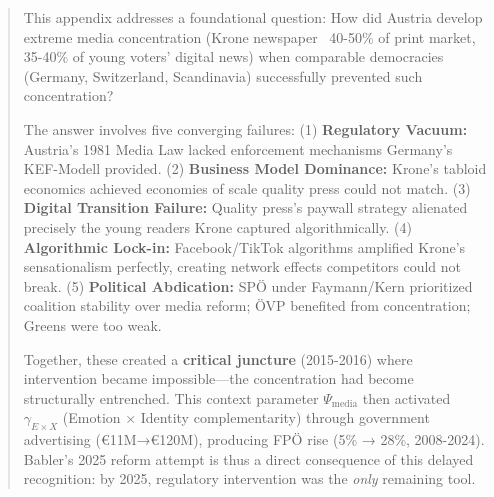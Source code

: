 
\begin{abstract}

This appendix addresses a foundational question: How did Austria develop extreme media concentration
(Krone newspaper ~40-50\% of print market, 35-40\% of young voters' digital news) when comparable democracies
(Germany, Switzerland, Scandinavia) successfully prevented such concentration?

The answer involves five converging failures: (1) \textbf{Regulatory Vacuum:} Austria's 1981 Media Law
lacked enforcement mechanisms Germany's KEF-Modell provided. (2) \textbf{Business Model Dominance:} Krone's
tabloid economics achieved economies of scale quality press could not match. (3) \textbf{Digital Transition Failure:}
Quality press's paywall strategy alienated precisely the young readers Krone captured algorithmically.
(4) \textbf{Algorithmic Lock-in:} Facebook/TikTok algorithms amplified Krone's sensationalism perfectly,
creating network effects competitors could not break. (5) \textbf{Political Abdication:} SPÖ under Faymann/Kern
prioritized coalition stability over media reform; ÖVP benefited from concentration; Greens were too weak.

Together, these created a \textbf{critical juncture} (2015-2016) where intervention became impossible---the
concentration had become structurally entrenched. This context parameter $\Psi_{\text{media}}$ then
activated $\gamma_{E \times X}$ (Emotion × Identity complementarity) through government advertising
(€11M→€120M), producing FPÖ rise (5\% → 28\%, 2008-2024). Babler's 2025 reform attempt is thus a direct
consequence of this delayed recognition: by 2025, regulatory intervention was the \textit{only} remaining tool.

\end{abstract}


